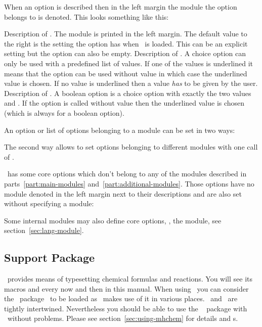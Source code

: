 \documentclass{chemmacros-manual}
\begin{document}
When an option is described then in the left margin the module the option
belongs to is denoted.  This looks something like this:
\begin{options}
  \Initial
    Description of . The module is printed in the left margin.
    The default value to the right is the setting the option has when
    \chemmacros\ is loaded.  This can be an explicit setting but the option
    can also be empty.
    Description of .  A choice option can only be used
    with a predefined list of values. If one of the values is underlined it
    means that the option can be used without value in which case the
    underlined value is chosen.  If no value is underlined then a value
    \emph{has} to be given by the user.
    Description of .  A boolean option is a choice
    option with exactly the two values  and .  If the
    option is called without value then the underlined value is chosen (which
    is always  for a boolean option).
\end{options}

An option or list of options belonging to a module  can be
set in two ways:
\begin{sourcecode}
\end{sourcecode}
The second way allows to set options belonging to different modules with one
call of .

\chemmacros\ has some core options which don't belong to any of the modules
described in parts~\ref{part:main-modules} and~\ref{part:additional-modules}.
Those options have no module denoted in the left margin next to their
descriptions and are also set without specifying a module:
\begin{sourcecode}
\end{sourcecode}
Some internal modules may also define core options, \eg, the 
module, see section~\vref{sec:lang-module}.

\subsection{Support Package \chemformula}\label{sec:supp-pack-chemf}
\chemformula\ provides means of typesetting chemical formulas and reactions.
You will see its macros  and  every now and then in this
manual.  When using \chemmacros\ you can consider the \chemformula\
package~\cite{pkg:chemformula} to be loaded as \chemmacros\ makes use of it in
various places.  \chemmacros\ and \chemformula\ are tightly intertwined.
Nevertheless you should be able to use the \pkg{mhchem}~\cite{pkg:mhchem}
package with \chemmacros\ without problems. Please see
section~\vref{sec:using-mhchem} for details and s.
\end{document}
